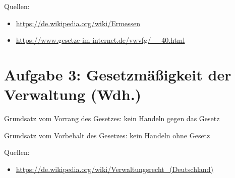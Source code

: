 \documentclass{article}
\begin{document}
		Quellen:
	\begin{itemize}
		\item \url{https://de.wikipedia.org/wiki/Ermessen}
		\item \url{https://www.gesetze-im-internet.de/vwvfg/__40.html}
	\end{itemize}

	\section*{Aufgabe 3: Gesetzmäßigkeit der Verwaltung (Wdh.)}
	Grundsatz vom Vorrang des Gesetzes: kein Handeln gegen das Gesetz
	
	Grundsatz vom Vorbehalt des Gesetzes: kein Handeln ohne Gesetz

	Quellen:
	\begin{itemize}
		\item \url{https://de.wikipedia.org/wiki/Verwaltungsrecht_(Deutschland)}
	\end{itemize}
\end{document}
